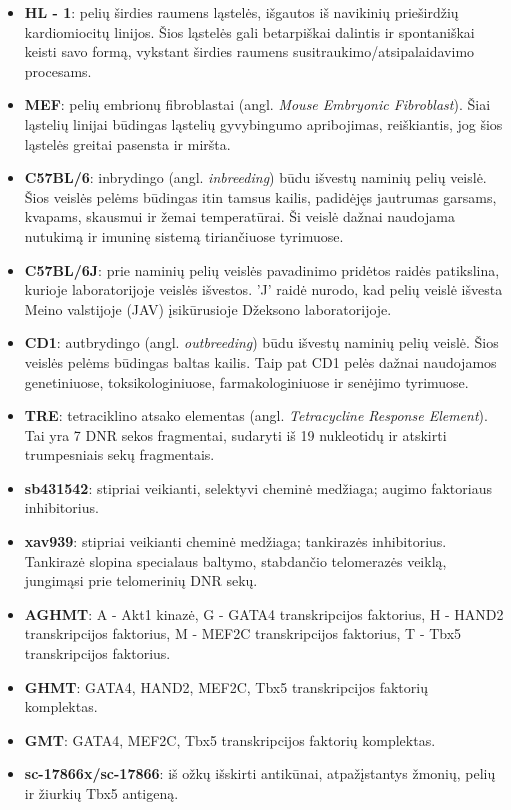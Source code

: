 \documentclass[12pt]{article}
\begin{document}
\begin{itemize}
    \item \textbf{HL - 1}: pelių širdies raumens ląstelės, išgautos iš
        navikinių prieširdžių kardiomiocitų linijos. Šios ląstelės gali
        betarpiškai dalintis ir spontaniškai keisti savo formą, vykstant
        širdies raumens susitraukimo/atsipalaidavimo procesams.
    \item \textbf{MEF}: pelių embrionų fibroblastai (angl. \emph{Mouse
        Embryonic Fibroblast}). Šiai ląstelių linijai būdingas ląstelių
        gyvybingumo apribojimas, reiškiantis, jog šios ląstelės greitai
        pasensta ir miršta.
    \item \textbf{C57BL/6}: inbrydingo (angl. \emph{inbreeding}) būdu išvestų
        naminių pelių veislė. Šios veislės pelėms būdingas itin tamsus
        kailis, padidėjęs jautrumas garsams, kvapams, skausmui ir žemai
        temperatūrai. Ši veislė dažnai naudojama nutukimą ir imuninę sistemą
        tiriančiuose tyrimuose.
    \item \textbf{C57BL/6J}: prie naminių pelių veislės pavadinimo pridėtos
        raidės patikslina, kurioje laboratorijoje veislės išvestos. 'J' raidė
        nurodo, kad pelių veislė išvesta Meino valstijoje (JAV) įsikūrusioje
        Džeksono laboratorijoje\cite{JCKSLAB}.
    \item \textbf{CD1}: autbrydingo (angl. \emph{outbreeding}) būdu išvestų
        naminių pelių veislė. Šios veislės pelėms būdingas baltas kailis.
        Taip pat CD1 pelės dažnai naudojamos genetiniuose, toksikologiniuose,
        farmakologiniuose ir senėjimo tyrimuose.
    \item \textbf{TRE}: tetraciklino atsako elementas (angl. \emph{Tetracycline
        Response Element}). Tai yra 7 DNR sekos fragmentai,
        sudaryti iš 19 nukleotidų ir atskirti trumpesniais sekų fragmentais.
    \item \textbf{sb431542}: stipriai veikianti, selektyvi cheminė medžiaga;
        augimo faktoriaus inhibitorius.
    \item \textbf{xav939}: stipriai veikianti cheminė medžiaga; tankirazės
        inhibitorius. Tankirazė slopina specialaus baltymo, stabdančio
        telomerazės veiklą, jungimąsi prie telomerinių DNR sekų.
    \item \textbf{AGHMT}: A - Akt1 kinazė, G - GATA4 transkripcijos faktorius,
        H - HAND2 transkripcijos faktorius, M - MEF2C transkripcijos faktorius,
        T - Tbx5 transkripcijos faktorius.
    \item \textbf{GHMT}: GATA4, HAND2, MEF2C, Tbx5 transkripcijos faktorių
        komplektas.
    \item \textbf{GMT}: GATA4, MEF2C, Tbx5 transkripcijos faktorių komplektas.
    \item \textbf{sc-17866x/sc-17866}: iš ožkų išskirti antikūnai,
        atpažįstantys žmonių, pelių ir žiurkių Tbx5 antigeną.
\end{itemize}
\end{document}

